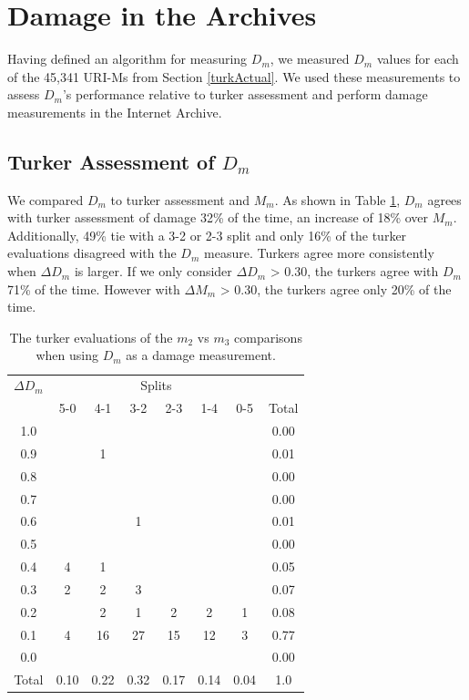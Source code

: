 \section{Damage in the Archives}
\label{eval} 

Having defined an algorithm for measuring $D_m$, we measured $D_m$ values for each of the 45,341 URI-Ms from Section \ref{turkActual}. We used these measurements to assess $D_m$'s performance relative to turker assessment and perform damage measurements in the Internet Archive.

\subsection{Turker Assessment of $D_m$}
\label{turkerDm}


We compared $D_m$ to turker assessment and $M_m$. As shown in Table \ref{m2table}, $D_m$ agrees with turker assessment of damage 32\% of the time, an increase of 18\% over $M_m$. Additionally, 49\% tie with a 3-2 or 2-3 split and only 16\% of the turker evaluations disagreed with the $D_m$ measure. Turkers agree more consistently when {$\Delta D_m$} is larger. If we only consider {$\Delta D_m$} > 0.30, the turkers agree with $D_m$ 71\% of the time. However with {$\Delta M_m$} > 0.30, the turkers agree only 20\% of the time. 


\begin{table}
\begin{tabular}{ c | c | c | c | c | c | c || c}
    {$\Delta D_m$} &  \multicolumn{6}{c}{Splits}\\
  & 5-0 & 4-1 & 3-2 & 2-3 & 1-4 & 0-5 & Total\\
\hline
1.0 &  &  &  &  &  & & 0.00\\
0.9 &  & 1 &  &  &  & & 0.01\\
0.8 &  &  &  &  &  & & 0.00\\
0.7 &  &  &  &  &  & & 0.00\\
0.6 &  &  & 1 &  &  & & 0.01\\
0.5 &  &  &  &  &  & & 0.00\\
0.4 & 4 & 1 &  &  &  & & 0.05\\
0.3 & 2 & 2 & 3 &  &  & & 0.07\\
0.2 &  & 2 & 1 & 2 & 2 & 1& 0.08\\
0.1 & 4 & 16 & 27 & 15 & 12 & 3& 0.77\\
0.0 &  &  &  &  &  & & 0.00\\
\hline
Total & 0.10 & 0.22 & 0.32 & 0.17 & 0.14 & 0.04 & 1.0
\end{tabular}
  \caption{The turker evaluations of the $m_2$ vs $m_3$ comparisons when using $D_m$ as a damage measurement.}
  \label{m2table}
\end{table}



